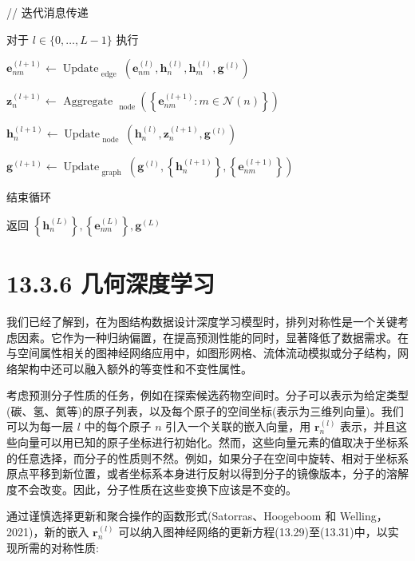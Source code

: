 \documentclass[10pt]{article}
\begin{document}
// 迭代消息传递

对于 \(l \in  \{ 0,\ldots ,L - 1\}\) 执行

\({\mathbf{e}}_{nm}^{\left( l + 1\right) } \leftarrow  {\operatorname{Update}}_{\text{ edge }}\left( {{\mathbf{e}}_{nm}^{\left( l\right) },{\mathbf{h}}_{n}^{\left( l\right) },{\mathbf{h}}_{m}^{\left( l\right) },{\mathbf{g}}^{\left( l\right) }}\right)\)

\({\mathbf{z}}_{n}^{\left( l + 1\right) } \leftarrow  {\text{ Aggregate }}_{\text{ node }}\left( \left\{  {{\mathbf{e}}_{nm}^{\left( l + 1\right) } : m \in  \mathcal{N}\left( n\right) }\right\}  \right)\)

\({\mathbf{h}}_{n}^{\left( l + 1\right) } \leftarrow  {\operatorname{Update}}_{\text{ node }}\left( {{\mathbf{h}}_{n}^{\left( l\right) },{\mathbf{z}}_{n}^{\left( l + 1\right) },{\mathbf{g}}^{\left( l\right) }}\right)\)

\({\mathbf{g}}^{\left( l + 1\right) } \leftarrow  {\operatorname{Update}}_{\text{ graph }}\left( {{\mathbf{g}}^{\left( l\right) },\left\{  {\mathbf{h}}_{n}^{\left( l + 1\right) }\right\}  ,\left\{  {\mathbf{e}}_{nm}^{\left( l + 1\right) }\right\}  }\right)\)

结束循环

返回 \(\left\{  {\mathbf{h}}_{n}^{\left( L\right) }\right\}  ,\left\{  {\mathbf{e}}_{nm}^{\left( L\right) }\right\}  ,{\mathbf{g}}^{\left( L\right) }\)

\section*{13.3.6 几何深度学习}

我们已经了解到，在为图结构数据设计深度学习模型时，排列对称性是一个关键考虑因素。它作为一种归纳偏置，在提高预测性能的同时，显著降低了数据需求。在与空间属性相关的图神经网络应用中，如图形网格、流体流动模拟或分子结构，网络架构中还可以融入额外的等变性和不变性属性。

考虑预测分子性质的任务，例如在探索候选药物空间时。分子可以表示为给定类型(碳、氢、氮等)的原子列表，以及每个原子的空间坐标(表示为三维列向量)。我们可以为每一层 \(l\) 中的每个原子 \(n\) 引入一个关联的嵌入向量，用 \({\mathbf{r}}_{n}^{\left( l\right) }\) 表示，并且这些向量可以用已知的原子坐标进行初始化。然而，这些向量元素的值取决于坐标系的任意选择，而分子的性质则不然。例如，如果分子在空间中旋转、相对于坐标系原点平移到新位置，或者坐标系本身进行反射以得到分子的镜像版本，分子的溶解度不会改变。因此，分子性质在这些变换下应该是不变的。

通过谨慎选择更新和聚合操作的函数形式(Satorras、Hoogeboom 和 Welling，2021)，新的嵌入 \({\mathbf{r}}_{n}^{\left( l\right) }\) 可以纳入图神经网络的更新方程(13.29)至(13.31)中，以实现所需的对称性质:
\end{document}
